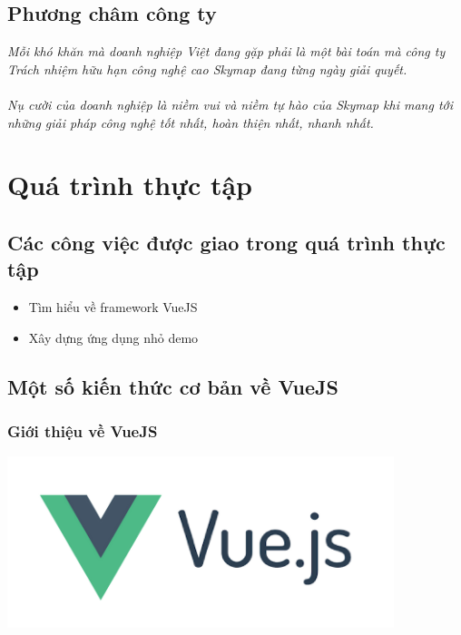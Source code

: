 \documentclass[12pt,a4paper]{report}
\begin{document}
\section{Phương châm công ty}
\textit{Mỗi khó khăn mà doanh nghiệp Việt đang gặp phải là một bài toán mà công ty Trách nhiệm hữu hạn công nghệ cao Skymap đang từng ngày giải quyết.}\\\\
\textit{Nụ cười của doanh nghiệp là niềm vui và niềm tự hào của Skymap khi mang tới những giải pháp công nghệ tốt nhất, hoàn thiện nhất, nhanh nhất.}

\chapter{Quá trình thực tập}
\section{Các công việc được giao trong quá trình thực tập}
\begin{itemize}
	\item Tìm hiểu về framework VueJS
	\item Xây dựng ứng dụng nhỏ demo 
\end{itemize}
\section{Một số kiến thức cơ bản về VueJS}
\subsection{Giới thiệu về VueJS}
\begin{center}
	\includegraphics[scale=.8]{1}
\end{center}
\end{document}
